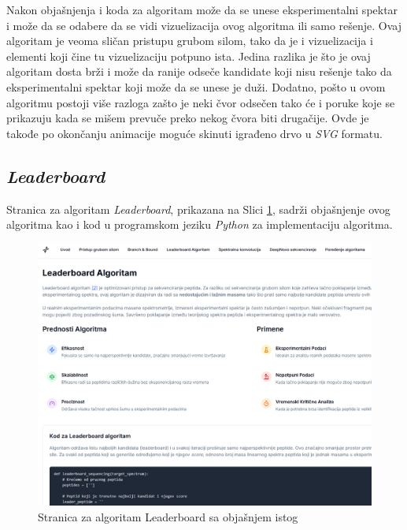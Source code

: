 \documentclass[12pt,oneside]{memoir}
\begin{document}
Nakon objašnjenja i koda za algoritam može da se unese eksperimentalni spektar i može da se odabere da se vidi vizuelizacija ovog algoritma ili samo rešenje. Ovaj algoritam je veoma sličan pristupu grubom silom, tako da je i vizuelizacija i elementi koji čine tu vizuelizaciju potpuno ista. Jedina razlika je što je ovaj algoritam dosta brži i može da ranije odseče kandidate koji nisu rešenje tako da eksperimentalni spektar koji može da se unese je duži. Dodatno, pošto u ovom algoritmu postoji više razloga zašto je neki čvor odsečen tako će i poruke koje se prikazuju kada se mišem prevuče preko nekog čvora biti drugačije. Ovde je takođe po okončanju animacije moguće skinuti igrađeno drvo u \emph{SVG} formatu.

\subsection{\emph{Leaderboard}}
Stranica za algoritam \emph{Leaderboard}, prikazana na Slici \ref{fig:leaderboard_1}, sadrži objašnjenje ovog algoritma kao i kod u programskom jeziku \emph{Python} za implementaciju algoritma.
\begin{figure}[H]
\centering
\includegraphics[width=1\textwidth]{images/leaderboard_1.png}
\caption{Stranica za algoritam Leaderboard sa objašnjem istog}
\label{fig:leaderboard_1}
\end{figure}
\end{document}
